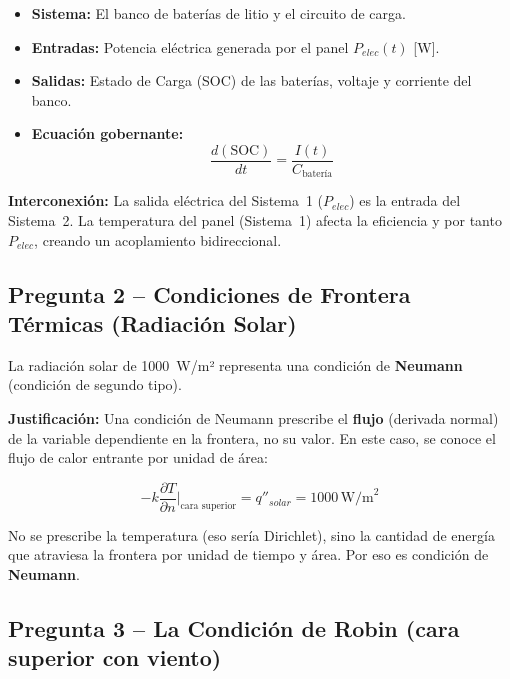 \documentclass[12pt,a4paper]{article}
\begin{document}
\begin{itemize}
    \item \textbf{Sistema:} El banco de baterías de litio y el circuito de carga.
    \item \textbf{Entradas:} Potencia eléctrica generada por el panel $P_{elec}(t)$ [W].
    \item \textbf{Salidas:} Estado de Carga (SOC) de las baterías, voltaje y corriente del banco.
    \item \textbf{Ecuación gobernante:}
          \begin{equation}
              \frac{d(\text{SOC})}{dt} = \frac{I(t)}{C_{\text{batería}}}
          \end{equation}
\end{itemize}

\noindent\textbf{Interconexión:} La salida eléctrica del Sistema~1 ($P_{elec}$) es la entrada del
Sistema~2. La temperatura del panel (Sistema~1) afecta la eficiencia y por tanto $P_{elec}$,
creando un acoplamiento bidireccional.

\subsection*{Pregunta 2 -- Condiciones de Frontera Térmicas (Radiación Solar)}

\noindent La radiación solar de 1000~W/m² representa una condición de \textbf{Neumann}
(condición de segundo tipo).

\noindent\textbf{Justificación:} Una condición de Neumann prescribe el \textbf{flujo} (derivada
normal) de la variable dependiente en la frontera, no su valor. En este caso, se conoce el flujo
de calor entrante por unidad de área:

\begin{equation}
    -k\frac{\partial T}{\partial n}\bigg|_{\text{cara superior}} = q''_{solar}
    = 1000\,\text{W/m}^2
\end{equation}

\noindent No se prescribe la temperatura (eso sería Dirichlet), sino la cantidad de energía que
atraviesa la frontera por unidad de tiempo y área. Por eso es condición de \textbf{Neumann}.

\subsection*{Pregunta 3 -- La Condición de Robin (cara superior con viento)}
\end{document}

